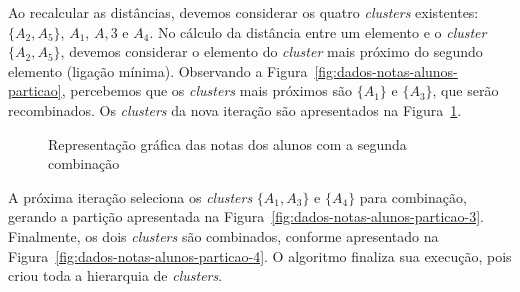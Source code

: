 Ao recalcular as distâncias, devemos considerar os quatro \textit{clusters} existentes: $\{A_2, A_5\}$, $A_1$, $A,3$ e $A_4$. No cálculo da distância entre um elemento e o \textit{cluster} $\{A_2, A_5\}$, devemos considerar o elemento do \textit{cluster} mais próximo do segundo elemento (ligação mínima). Observando a Figura~\ref{fig:dados-notas-alunos-particao}, percebemos que os \textit{clusters} mais próximos são $\{A_1\}$ e $\{A_3\}$, que serão recombinados. Os \textit{clusters} da nova iteração são apresentados na Figura~\ref{fig:dados-notas-alunos-particao-2}.

\begin{figure}[h]
	\centering
	
	
	\caption{Representação gráfica das notas dos alunos com a segunda combinação}
	\label{fig:dados-notas-alunos-particao-2}
\end{figure}

A próxima iteração seleciona os \textit{clusters} $\{A_1, A_3\}$ e $\{A_4\}$ para combinação, gerando a partição apresentada na Figura~\ref{fig:dados-notas-alunos-particao-3}. Finalmente, os dois \textit{clusters} são combinados, conforme apresentado na Figura~\ref{fig:dados-notas-alunos-particao-4}. O algoritmo finaliza sua execução, pois criou toda a hierarquia de \textit{clusters}.

